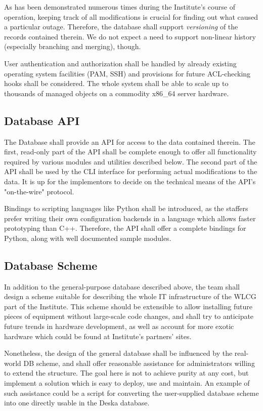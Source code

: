 \documentclass{article}
\begin{document}
As has been demonstrated numerous times during the Institute's course of operation, keeping track of all modifications is crucial
for finding out what caused a particular outage.  Therefore, the database shall support {\em versioning} of the records contained
therein.  We do not expect a need to support non-linear history (especially branching and merging), though.

User authentication and authorization shall be handled by already existing operating system facilities (PAM, SSH) and provisions
for future ACL-checking hooks shall be considered.  The whole system shall be able to scale up to thousands of managed objects on
a commodity x86\_64 server hardware.

\subsection{Database API}

The Database shall provide an API for access to the data contained therein. The first, read-only part of the API shall be complete
enough to offer all functionality required by various modules and utilities described below.  The second part of the API shall be
used by the CLI interface for performing actual modifications to the data.  It is up for the implementors to decide on the
technical means of the API's "on-the-wire" protocol.

Bindings to scripting languages like Python shall be introduced, as the staffers prefer writing their own configuration backends
in a language which allows faster prototyping than C++.  Therefore, the API shall offer a complete bindings for Python, along with
well documented sample modules.

\subsection{Database Scheme}

In addition to the general-purpose database described above, the team shall design a scheme suitable for describing the whole IT
infrastructure of the WLCG part of the Institute.  This scheme should be extensible to allow installing future pieces of equipment
without large-scale code changes, and shall try to anticipate future trends in hardware development, as well as account for more
exotic hardware which could be found at Institute's partners' sites.

Nonetheless, the design of the general database shall be influenced by the real-world DB scheme, and shall offer reasonable
assistance for administrators willing to extend the structure.  The goal here is not to achieve purity at any cost, but implement
a solution which is easy to deploy, use and maintain. An example of such assistance could be a script for converting the
user-supplied database scheme into one directly usable in the Deska database. 
\end{document}
